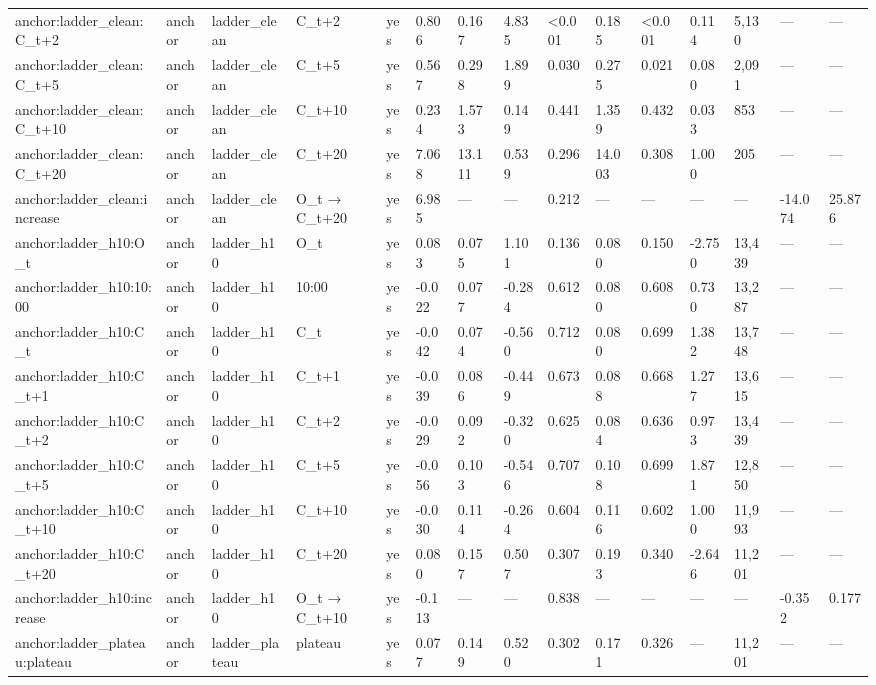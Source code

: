 \begin{tabular}{lllllllllllllll}
anchor:ladder\_clean:C\_t+2 & anchor & ladder\_clean & C\_t+2 & yes & 0.806 & 0.167 & 4.835 & <0.001 & 0.185 & <0.001 & 0.114 & 5,130 & — & — \\
anchor:ladder\_clean:C\_t+5 & anchor & ladder\_clean & C\_t+5 & yes & 0.567 & 0.298 & 1.899 & 0.030 & 0.275 & 0.021 & 0.080 & 2,091 & — & — \\
anchor:ladder\_clean:C\_t+10 & anchor & ladder\_clean & C\_t+10 & yes & 0.234 & 1.573 & 0.149 & 0.441 & 1.359 & 0.432 & 0.033 & 853 & — & — \\
anchor:ladder\_clean:C\_t+20 & anchor & ladder\_clean & C\_t+20 & yes & 7.068 & 13.111 & 0.539 & 0.296 & 14.003 & 0.308 & 1.000 & 205 & — & — \\
anchor:ladder\_clean:increase & anchor & ladder\_clean & O\_t → C\_t+20 & yes & 6.985 & — & — & 0.212 & — & — & — & — & -14.074 & 25.876 \\
anchor:ladder\_h10:O\_t & anchor & ladder\_h10 & O\_t & yes & 0.083 & 0.075 & 1.101 & 0.136 & 0.080 & 0.150 & -2.750 & 13,439 & — & — \\
anchor:ladder\_h10:10:00 & anchor & ladder\_h10 & 10:00 & yes & -0.022 & 0.077 & -0.284 & 0.612 & 0.080 & 0.608 & 0.730 & 13,287 & — & — \\
anchor:ladder\_h10:C\_t & anchor & ladder\_h10 & C\_t & yes & -0.042 & 0.074 & -0.560 & 0.712 & 0.080 & 0.699 & 1.382 & 13,748 & — & — \\
anchor:ladder\_h10:C\_t+1 & anchor & ladder\_h10 & C\_t+1 & yes & -0.039 & 0.086 & -0.449 & 0.673 & 0.088 & 0.668 & 1.277 & 13,615 & — & — \\
anchor:ladder\_h10:C\_t+2 & anchor & ladder\_h10 & C\_t+2 & yes & -0.029 & 0.092 & -0.320 & 0.625 & 0.084 & 0.636 & 0.973 & 13,439 & — & — \\
anchor:ladder\_h10:C\_t+5 & anchor & ladder\_h10 & C\_t+5 & yes & -0.056 & 0.103 & -0.546 & 0.707 & 0.108 & 0.699 & 1.871 & 12,850 & — & — \\
anchor:ladder\_h10:C\_t+10 & anchor & ladder\_h10 & C\_t+10 & yes & -0.030 & 0.114 & -0.264 & 0.604 & 0.116 & 0.602 & 1.000 & 11,993 & — & — \\
anchor:ladder\_h10:C\_t+20 & anchor & ladder\_h10 & C\_t+20 & yes & 0.080 & 0.157 & 0.507 & 0.307 & 0.193 & 0.340 & -2.646 & 11,201 & — & — \\
anchor:ladder\_h10:increase & anchor & ladder\_h10 & O\_t → C\_t+10 & yes & -0.113 & — & — & 0.838 & — & — & — & — & -0.352 & 0.177 \\
anchor:ladder\_plateau:plateau & anchor & ladder\_plateau & plateau & yes & 0.077 & 0.149 & 0.520 & 0.302 & 0.171 & 0.326 & — & 11,201 & — & — \\

\end{tabular}
